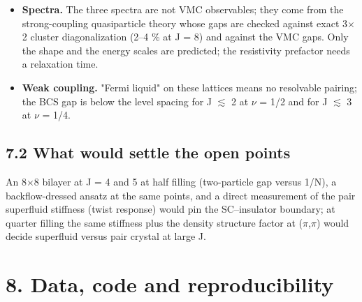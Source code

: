 \documentclass[10pt]{article}
\begin{document}
\begin{itemize}
The spin sector uses a Pfaffian-type triplet block with both a Fermi-liquid-triplet and a triplon component and
is evaluated at total momentum (0,0) and ($\pi$,$\pi$) only; the odd sectors use one unpaired orbital.
\item \textbf{Spectra.} The three spectra are not VMC observables; they come from the strong-coupling quasiparticle theory
whose gaps are checked against exact 3$\times$2 cluster diagonalization (2--4 \% at J = 8) and against the VMC gaps.
Only the shape and the energy scales are predicted; the resistivity prefactor needs a relaxation time.
\item \textbf{Weak coupling.} "Fermi liquid" on these lattices means no resolvable pairing; the BCS gap is below the
level spacing for J $\lesssim$ 2 at $\nu$ = 1/2 and for J $\lesssim$ 3 at $\nu$ = 1/4.
\end{itemize}

\subsection*{7.2 What would settle the open points}

An 8$\times$8 bilayer at J = 4 and 5 at half filling (two-particle gap versus 1/N), a backflow-dressed ansatz at the same points, and a direct measurement of the pair superfluid stiffness (twist response) would pin the SC--insulator boundary; at quarter filling the same stiffness plus the density structure factor at ($\pi$,$\pi$) would decide superfluid versus pair crystal at large J.

\section*{8. Data, code and reproducibility}
\end{document}
